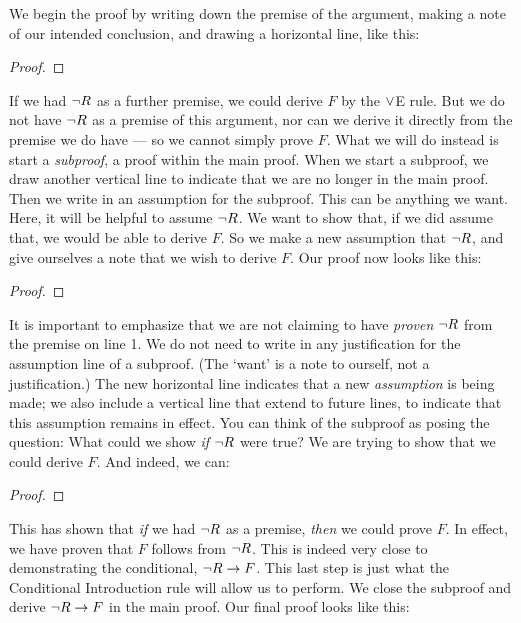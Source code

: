 We begin the proof by writing down the premise of the argument, making a note of our intended conclusion, and drawing a horizontal line, like this:

\begin{proof}
	 
\end{proof}

If we had $\neg R$ as a further premise, we could derive $F$ by the $\vee$E rule. But we do not have $\neg R$ as a premise of this argument, nor can we derive it directly from the premise we do have --- so we cannot simply prove $F$. What we will do instead is start a \emph{subproof}, a proof within the main proof. When we start a subproof, we draw another vertical line to indicate that we are no longer in the main proof. Then we write in an assumption for the subproof. This can be anything we want. Here, it will be helpful to assume $\neg R$. We want to show that, if we did assume that, we would be able to derive $F$. So we make a new assumption that $\neg R$, and give ourselves a note that we wish to derive $F$. Our proof now looks like this:

\begin{proof}
	  
	\open
		 
		\have{}{}
	\close
\end{proof}

It is important to emphasize that we are not claiming to have \emph{proven} $\neg R$ from the premise on line 1. We do not need to write in any justification for the assumption line of a subproof. (The `want' is a note to ourself, not a justification.) The new horizontal line indicates that a new \emph{assumption} is being made; we also include a vertical line that extend to future lines, to indicate that this assumption remains in effect. You can think of the subproof as posing the question: What could we show \emph{if} $\neg R$ were true? We are trying to show that we could derive $F$. And indeed, we can:

\begin{proof}
	  
	\open
		 
	\close
\end{proof}

This has shown that \emph{if} we had $\neg R$ as a premise, \emph{then} we could prove $F$. In effect, we have proven that $F$ follows from $\neg R$. This is indeed very close to demonstrating the conditional, $\neg R \rightarrow F$. This last step is just what the Conditional Introduction rule will allow us to perform. We close the subproof and derive $\neg R \rightarrow F$ in the main proof. Our final proof looks like this:


